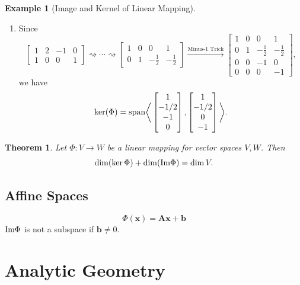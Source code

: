 \documentclass[12pt,openany]{book}
\newtheorem{theorem}{Theorem}[chapter]
\theoremstyle{definition}
\newtheorem{example}{Example}[chapter]
\newcommand{\img}{\textnormal{Im}}
\newcommand{\Sspan}[1]{\textnormal{span}\bigg\langle #1\bigg\rangle}
\begin{document}
\begin{example}[Image and Kernel of Linear Mapping]
\begin{enumerate}[(1)]
			\)
			\item Since \[
			\begin{bmatrix}
				1&2&-1&0\\1&0&0&1
			\end{bmatrix}\rightsquigarrow\cdots\rightsquigarrow\begin{bmatrix}
			1&0&0&1\\0&1&-\frac{1}{2}&-\frac{1}{2}
		\end{bmatrix}\xrightarrow[]{\text{Minus-1 Trick}}
			\begin{bmatrix}
				1&0&0&1\\0&1&-\frac{1}{2}&-\frac{1}{2}\\
				0&0&-1&0\\ 0&0&0&-1
			\end{bmatrix},
			\] we have \[
			\ker(\Phi)=\Sspan{\begin{bmatrix}1\\-1/2\\-1\\0\end{bmatrix},
					\begin{bmatrix}1\\-1/2\\0\\-1\end{bmatrix}}.
			\]
	\end{enumerate}
	\end{example}
	\vspace{8pt}
	\begin{tcolorbox}[colframe=thmcolor,title={\color{white}\bf Rank-Nullity Theorem (Fundamental Theorem of Linear Mapping)}]
		\begin{theorem}
			Let \(\Phi:V\to W\) be a linear mapping for vector spaces \(V,W\). Then \[
			\dim(\ker\Phi)+\dim(\img\Phi)=\dim V.
			\]
		\end{theorem}
	\end{tcolorbox}

	\section{Affine Spaces}
	\[
	\Phi(\textbf{x})=\textbf{A}\textbf{x}+\textbf{b}
	\] \(\img\Phi\) is not a subspace if \(\textbf{b}\neq 0\).
	
	\newpage
	\chapter{Analytic Geometry}
	
\end{document}
